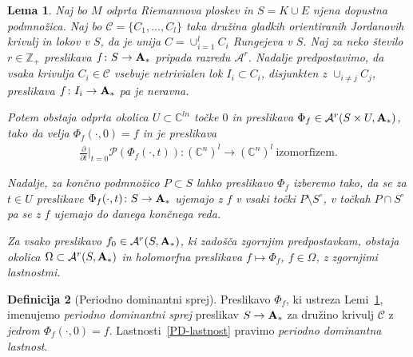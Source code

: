 \documentclass[12pt,a4paper,twoside]{article}
\theoremstyle{definition} %
\newtheorem{definicija}{Definicija}[section]
\theoremstyle{plain} %
\newtheorem{lema}[definicija]{Lema}
\numberwithin{equation}{section}  %
\newcommand{\Z}{\mathbb Z}
\newcommand{\C}{\mathbb C}
\begin{document}
\begin{lema} \label{lema:P-D-sprej}
Naj bo $M$ odprta Riemannova ploskev in $S = K \cup E$ njena dopustna podmnožica. Naj bo $\mathcal{C} = \{C_1, \dots , C_{l} \}$ taka družina gladkih orientiranih Jordanovih krivulj in lokov v $S$, da je unija $C = \cup_{i=1}^{l} C_{i}$ Rungejeva v $S$.
Naj za neko število $r \in \Z_{+}$ preslikava $f \colon S \to \textbf{\textup{A}}_{*}$ pripada razredu $\mathcal{A}^{r}$.
Nadalje predpostavimo, da vsaka krivulja $C_{i} \in \mathcal{C}$ vsebuje netrivialen lok $I_{i} \subset C_{i}$, disjunkten z $\cup_{i \neq j}C_{j}$, preslikava $f \colon I_{i} \to \textbf{\textup{A}}_{*}$ pa je neravna.

Potem obstaja odprta okolica $U \subset \C^{ln}$ točke $0$ in preslikava $\Phi_{f} \in \mathcal{A}^{r} (S \times U, \textbf{\textup{A}}_{*})$, tako da velja
$\Phi_{f}(\cdot, 0) = f$ in je preslikava
\begin{gather} \label{PD-lastnost}
	 \frac{\partial}{\partial t} \Big|_{t=0} \mathcal{P}(\Phi_{f}(\cdot, t)) \colon (\C^{n})^{l} \to (\C^{n})^{l} \ \text{izomorfizem.}
\end{gather}

Nadalje, za končno podmnožico $P \subset S$ lahko preslikavo $\Phi_{f}$ izberemo tako, da se za $t \in U$ preslikave $\Phi_{f}(\cdot, t) \colon S \to\textbf{\textup{A}}_{*}$ ujemajo z $f$ v vsaki točki $P \setminus S^\circ$, v točkah $P \cap S^\circ$ pa se z $f$ ujemajo do danega končnega reda.

Za vsako preslikavo $f_{0} \in \mathcal{A}^{r}(S, \textbf{\textup{A}}_{*})$, ki zadošča zgornjim predpostavkam, obstaja okolica $\Omega \subset \mathcal{A}^{r}(S, \textbf{\textup{A}}_{*})$ in holomorfna preslikava $f \mapsto \Phi_{f}$, $f \in \Omega$, z zgornjimi lastnostmi.
\end{lema}

\begin{definicija} [Periodno dominantni sprej]
Preslikavo $\Phi_{f}$, ki ustreza Lemi~\ref{lema:P-D-sprej}, imenujemo \emph{periodno dominantni sprej} preslikav $S \to \textbf{\textup{A}}_{*}$ za družino krivulj $\mathcal{C}$ z \emph{jedrom} $\Phi_{f}(\cdot, 0) = f$. Lastnosti~\eqref{PD-lastnost} pravimo \emph{periodno dominantna lastnost}.
\end{definicija}
\end{document}

